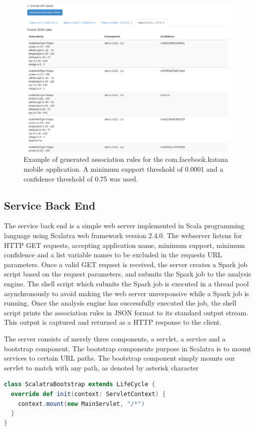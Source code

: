 \begin{figure}[!htbp]
	\centering
	\includegraphics[width=\textwidth]{images/frontend/frontend_rule_list.png}
	\caption{Example of generated  association rules for the com.facebook.katana mobile application. A minimum support threshold of 0.0001 and a confidence threshold of 0.75 was used.}
	\label{figure:frontend-example-rule-list}
\end{figure}

\subsection{Service Back End}

The service back end is a simple web server implemented in Scala programming language using Scalatra web framework version 2.4.0. The webserver listens for HTTP GET requests, accepting application name, minimum support, minimum confidence and a list variable names to be excluded in the requests URL parameters. Once a valid GET request is received, the server creates a Spark job script based on the request parameters, and submits the Spark job to the analysis engine. The shell script which submits the Spark job is executed in a thread pool asynchronously to avoid making the web server unresponsive while a Spark job is running. Once the analysis engine has successfully executed the job, the shell script prints the association rules in JSON format to its standard output stream. This output is captured and returned as a HTTP response to the client.

The server consists of merely three components, a servlet, a service and a bootstrap component. The bootstrap components purpose in Scalatra is to mount services to certain URL paths. The bootstrap component simply mounts our servlet to match with any path, as denoted by asterisk character 
\begin{minipage}{\linewidth}
\begin{lstlisting}[language=scala]
class ScalatraBootstrap extends LifeCycle {
  override def init(context: ServletContext) {
    context.mount(new MainServlet, "/*")
  }
}
\end{lstlisting}
\end{minipage}   

